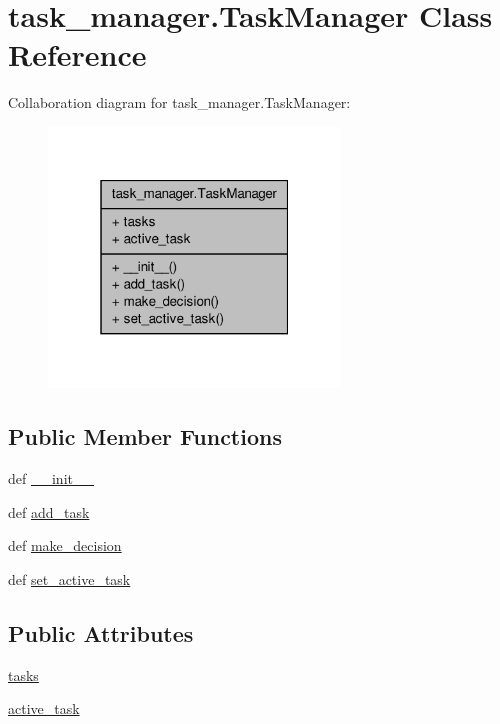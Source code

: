 \hypertarget{classtask__manager_1_1TaskManager}{\section{task\+\_\+manager.\+Task\+Manager Class Reference}
\label{classtask__manager_1_1TaskManager}
}


Collaboration diagram for task\+\_\+manager.\+Task\+Manager\+:\nopagebreak
\begin{figure}[H]
\begin{center}
\leavevmode
\includegraphics[width=220pt]{classtask__manager_1_1TaskManager__coll__graph}
\end{center}
\end{figure}
\subsection*{Public Member Functions}
\begin{DoxyCompactItemize}
\item 
def \hyperlink{classtask__manager_1_1TaskManager_a750d99ccae60977d027c156d607a245d}{\+\_\+\+\_\+init\+\_\+\+\_\+}
\item 
def \hyperlink{classtask__manager_1_1TaskManager_a4cedc030cbfa126c93c7050896111283}{add\+\_\+task}
\item 
def \hyperlink{classtask__manager_1_1TaskManager_a623b3d93407140ddd95753251f850f0b}{make\+\_\+decision}
\item 
def \hyperlink{classtask__manager_1_1TaskManager_ae6fddee07733c42fb3e8e29b3e45af8c}{set\+\_\+active\+\_\+task}
\end{DoxyCompactItemize}
\subsection*{Public Attributes}
\begin{DoxyCompactItemize}
\item 
\hyperlink{classtask__manager_1_1TaskManager_a13e69f2bbcef1d7ca03e92235cf9772e}{tasks}
\item 
\hyperlink{classtask__manager_1_1TaskManager_a3389ea690b2ade9bfe1efa5ad079b777}{active\+\_\+task}
\end{DoxyCompactItemize}


